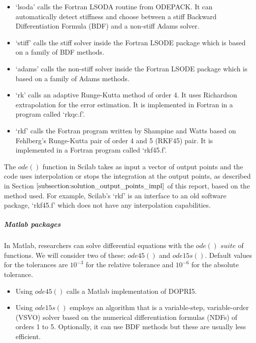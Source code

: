 \begin{itemize}
\item `lsoda' calls the Fortran LSODA routine from ODEPACK. It can automatically detect stiffness and choose between a stiff Backward Differentiation Formula (BDF) and a non-stiff Adams solver.

\item `stiff' calls the stiff solver inside the Fortran LSODE package which is based on a family of BDF methods.

\item `adams' calls the non-stiff solver inside the Fortran LSODE package which is based on a family of Adams methods.

\item `rk' calls an adaptive Runge-Kutta method of order 4. It uses Richardson extrapolation for the error estimation. It is implemented in Fortran in a program called `rkqc.f'.

\item `rkf' calls the Fortran program written by Shampine and Watts based on Fehlberg's Runge-Kutta pair of order 4 and 5 (RKF45) pair. It is implemented in a Fortran program called `rkf45.f'.
\end{itemize}

The $ode()$ function in Scilab takes as input a vector of output points and the code uses interpolation or stops the integration at the output points, as described in Section $\ref{subsection:solution_output_points_impl}$ of this report, based on the method used. For example, Scilab's `rkf' is an interface to an old software package, `rkf45.f' which does not have any interpolation capabilities.

\subparagraph{Matlab packages}
In Matlab, researchers can solve differential equations with the $ode()$ $suite$ \cite{shampine1997matlab} of functions. We will consider two of these: $ode45()$ and $ode15s()$.
Default values for the tolerances are $10^{-3}$ for the relative tolerance and $10^{-6}$ for the absolute tolerance.

\begin{itemize}
\item Using $ode45()$ calls a Matlab implementation of DOPRI5.

\item Using $ode15s()$ employs an algorithm that is a variable-step, variable-order (VSVO) solver based on the numerical differentiation formulas (NDFs) of orders 1 to 5. Optionally, it can use BDF methods but these are usually less efficient.
\end{itemize}

